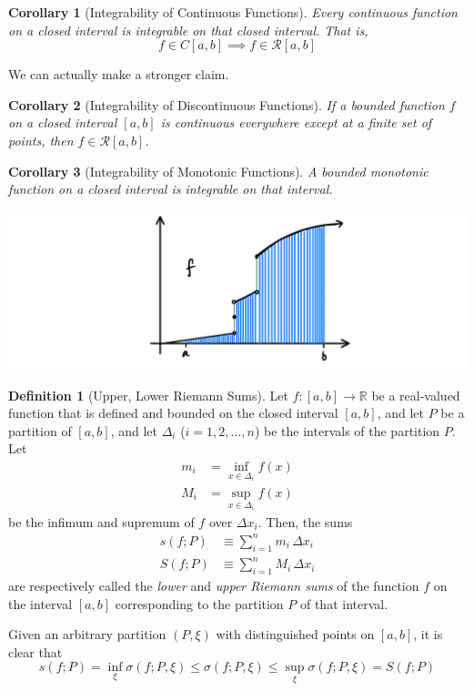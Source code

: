 \documentclass{article}
\newtheorem{corollary}{Corollary}[theorem]
\theoremstyle{remark}
\theoremstyle{definition}
\newtheorem{definition}{Definition}[section]
\begin{document}
\begin{corollary}[Integrability of Continuous Functions]
Every continuous function on a closed interval is integrable on that closed interval. That is, 
\[f \in C[a, b] \implies f \in \mathcal{R}[a, b]\]
\end{corollary}

We can actually make a stronger claim. 

\begin{corollary}[Integrability of Discontinuous Functions]
If a bounded function $f$ on a closed interval $[a, b]$ is continuous everywhere except at a finite set of points, then $f \in \mathcal{R}[a, b]$. 
\end{corollary}

\begin{corollary}[Integrability of Monotonic Functions]
A bounded monotonic function on a closed interval is integrable on that interval. 
\begin{center}
    \includegraphics[scale=0.3]{img/Integrability_of_Monotonic_Function.PNG}
\end{center}
\end{corollary}

\begin{definition}[Upper, Lower Riemann Sums]
Let $f: [a, b] \longrightarrow \mathbb{R}$ be a real-valued function that is defined and bounded on the closed interval $[a, b]$, and let $P$ be a partition of $[a, b]$, and let $\Delta_i$ ($i = 1, 2, \ldots, n$) be the intervals of the partition $P$. Let 
\begin{align*}
    m_i &= \inf_{x \in \Delta_i} f(x) \\
    M_i &= \sup_{x \in \Delta_i} f(x)
\end{align*}
be the infimum and supremum of $f$ over $\Delta x_i$. Then, the sums
\begin{align*}
    s(f; P) & \equiv \sum_{i = 1}^n m_i \, \Delta x_i \\
    S(f; P) & \equiv \sum_{i=1}^n M_i \, \Delta x_i
\end{align*}
are respectively called the \textit{lower} and \textit{upper Riemann sums} of the function $f$ on the interval $[a, b]$ corresponding to the partition $P$ of that interval. 

Given an arbitrary partition $(P, \xi)$ with distinguished points on $[a, b]$, it is clear that
\[s(f; P) = \inf_{\xi} \sigma(f; P, \xi) \leq \sigma(f; P, \xi) \leq \sup_{\xi} \sigma(f; P, \xi) = S(f; P)\]
\end{definition}
\end{document}
